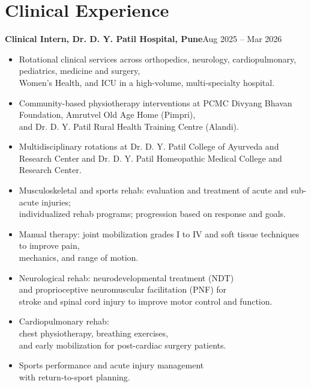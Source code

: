 \documentclass[11pt]{article}
\newcommand{\cvsubheading}[2]{\textbf{#1}\hfill #2\\}
\begin{document}
\section*{Clinical Experience}
\cvsubheading{Clinical Intern, Dr. D. Y. Patil Hospital, Pune}{Aug 2025 -- Mar 2026}
\begin{itemize}
  \item Rotational clinical services across orthopedics, neurology, cardiopulmonary, pediatrics, medicine and surgery,\\
  Women's Health, and ICU in a high-volume, multi-specialty hospital.
  \item Community-based physiotherapy interventions at PCMC Divyang Bhavan Foundation, Amrutvel Old Age Home (Pimpri),\\
  and Dr. D. Y. Patil Rural Health Training Centre (Alandi).
  \item Multidisciplinary rotations at Dr. D. Y. Patil College of Ayurveda and Research Center and Dr. D. Y. Patil Homeopathic Medical College and Research Center.
  \item Musculoskeletal and sports rehab: evaluation and treatment of acute and sub-acute injuries;\\
  individualized rehab programs; progression based on response and goals.
  \item Manual therapy: joint mobilization grades I to IV and soft tissue techniques to improve pain,\\
  mechanics, and range of motion.
  \item Neurological rehab: neurodevelopmental treatment (NDT)\\
  and proprioceptive neuromuscular facilitation (PNF) for\\
  stroke and spinal cord injury to improve motor control and function.
  \item Cardiopulmonary rehab:\\
  chest physiotherapy, breathing exercises,\\
  and early mobilization for post-cardiac surgery patients.
  \item Sports performance and acute injury management\\
  with return-to-sport planning.
\end{itemize}
\end{document}
